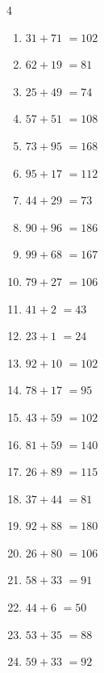 \begin{multicols}{4}
\begin{enumerate}
  \item $31+71$
        $=102$

  \item $62+19$
        $=81$

  \item $25+49$
        $=74$

  \item $57+51$
        $=108$

  \item $73+95$
        $=168$

  \item $95+17$
        $=112$

  \item $44+29$
        $=73$

  \item $90+96$
        $=186$

  \item $99+68$
        $=167$

  \item $79+27$
        $=106$

  \item $41+2$
        $=43$

  \item $23+1$
        $=24$

  \item $92+10$
        $=102$

  \item $78+17$
        $=95$

  \item $43+59$
        $=102$

  \item $81+59$
        $=140$

  \item $26+89$
        $=115$

  \item $37+44$
        $=81$

  \item $92+88$
        $=180$

  \item $26+80$
        $=106$

  \item $58+33$
        $=91$

  \item $44+6$
        $=50$

  \item $53+35$
        $=88$

  \item $59+33$
        $=92$


\end{enumerate}
\end{multicols}

